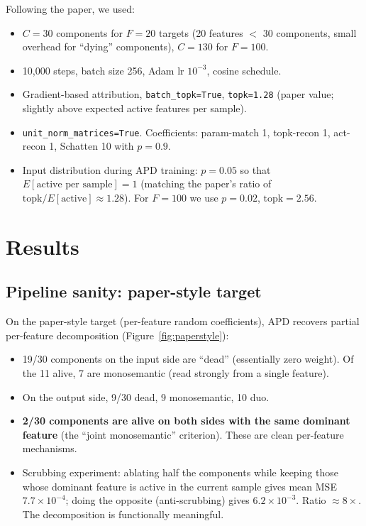 \documentclass[11pt]{article}
\begin{document}
Following the paper, we used:
\begin{itemize}
\item $C=30$ components for $F=20$ targets (20 features $<$ 30 components,
  small overhead for ``dying'' components), $C=130$ for $F=100$.
\item 10{,}000 steps, batch size 256, Adam lr $10^{-3}$, cosine schedule.
\item Gradient-based attribution, \texttt{batch\_topk=True}, \texttt{topk=1.28}
  (paper value; slightly above expected active features per sample).
\item \texttt{unit\_norm\_matrices=True}. Coefficients: param-match 1,
  topk-recon 1, act-recon 1, Schatten 10 with $p=0.9$.
\item Input distribution during APD training: $p = 0.05$ so that
  $E[\text{active per sample}] = 1$ (matching the paper's ratio of
  $\mathrm{topk}/E[\text{active}] \approx 1.28$). For $F=100$ we use
  $p=0.02$, $\mathrm{topk}=2.56$.
\end{itemize}

\section{Results}

\subsection{Pipeline sanity: paper-style target}

On the paper-style target (per-feature random coefficients), APD recovers
partial per-feature decomposition (Figure~\ref{fig:paperstyle}):
\begin{itemize}
\item 19/30 components on the input side are ``dead'' (essentially zero
  weight). Of the 11 alive, 7 are monosemantic (read strongly from a single
  feature).
\item On the output side, 9/30 dead, 9 monosemantic, 10 duo.
\item \textbf{2/30 components are alive on both sides with the same
  dominant feature} (the ``joint monosemantic'' criterion). These are
  clean per-feature mechanisms.
\item Scrubbing experiment: ablating half the components while keeping
  those whose dominant feature is active in the current sample gives
  mean MSE $7.7\times10^{-4}$; doing the opposite (anti-scrubbing) gives
  $6.2\times10^{-3}$. Ratio $\approx 8\times$. The decomposition is
  functionally meaningful.
\end{itemize}
\end{document}
